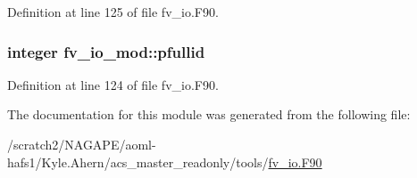 Definition at line 125 of file fv\-\_\-io.\-F90.

\subsubsection[{pfullid}]{\setlength{\rightskip}{0pt plus 5cm}integer fv\-\_\-io\-\_\-mod\-::pfullid\hspace{0.3cm}{\ttfamily [private]}}\label{classfv__io__mod_a8ac7b1dc39c4e3b84676b89697881b7b}


Definition at line 124 of file fv\-\_\-io.\-F90.



The documentation for this module was generated from the following file\-:\begin{DoxyCompactItemize}
\item 
/scratch2/\-N\-A\-G\-A\-P\-E/aoml-\/hafs1/\-Kyle.\-Ahern/acs\-\_\-master\-\_\-readonly/tools/\hyperlink{fv__io_8F90}{fv\-\_\-io.\-F90}\end{DoxyCompactItemize}
